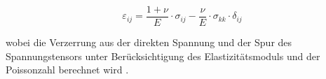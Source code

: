 \begin{description}
	 \begin{equation}
	 	\varepsilon_{ij} = 
	 	\frac{1+\nu}{E} \cdot \sigma_{ij} - \frac{\nu}{E} \cdot \sigma_{kk} \cdot \delta_{ij}
	 \end{equation}
	
	 wobei die Verzerrung aus der direkten Spannung und der Spur des Spannungstensors unter Berücksichtigung des Elastizitätsmoduls und der Poissonzahl berechnet wird \cite{elastomechanik:Grundlagen der Elastizitaetstheorie}.
\end{description}
